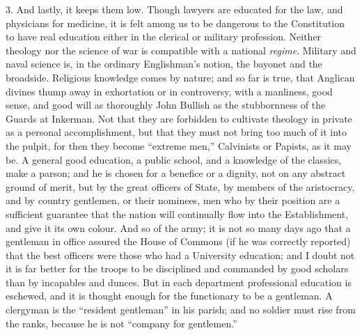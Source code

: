 3. And lastly, it keeps them low. Though lawyers
are educated for the law, and physicians for medicine, it is felt
among us to be dangerous to the Constitution to have real education
either in the clerical or military profession. Neither theology nor
the science of war is compatible with a national \emph{regime}.
Military and naval science is, in the ordinary Englishman's notion,
the bayonet and the broadside. Religious knowledge comes by nature;
and so far is true, that Anglican divines thump away in exhortation or
in controversy, with a manliness, good sense, and good will as
thoroughly John Bullish as the stubbornness of the Guards at Inkerman.
Not that they are forbidden to cultivate theology in private as a
personal accomplishment, but that they must not bring too much of it
into the pulpit, for then they become ``extreme men,'' Calvinists or
Papists, as it may be. A general good education, a public school, and
a knowledge of the classics, make a parson; and he is chosen for a
benefice or a dignity, not on any abstract ground of merit, but by the
great officers of State, by members of the aristocracy, and by country
gentlemen, or their nominees, men who by their position are a
sufficient guarantee that the nation will continually flow into
the Establishment, and give it its own colour. And so of the army; it
is not so many days ago that a gentleman in office assured the House
of Commons (if he was correctly reported) that the best officers were
those who had a University education; and I doubt not it is far better
for the troops to be disciplined and commanded by good scholars than
by incapables and dunces. But in each department professional
education is eschewed, and it is thought enough for the functionary to
be a gentleman. A clergyman is the ``resident gentleman'' in his parish;
and no soldier must rise from the ranks, because he is not ``company
for gentlemen.''

